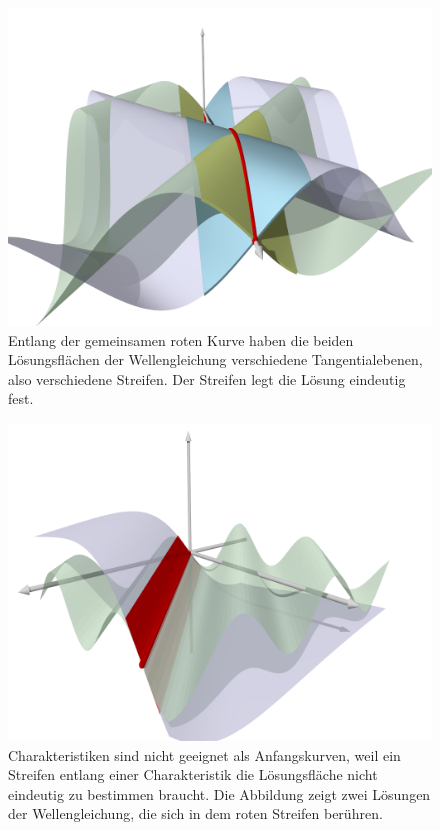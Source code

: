 \begin{figure}
\centering
\includegraphics[width=\hsize]{../common/3d/streifen2.png}
\caption{Entlang der gemeinsamen roten Kurve haben die beiden
Lösungsflächen der Wellengleichung verschiedene Tangentialebenen,
also verschiedene Streifen. 
Der Streifen legt die Lösung eindeutig fest.
\label{skript:streifen:eindeutig}}
\end{figure}

\begin{figure}
\centering
\includegraphics[width=\hsize]{../common/3d/streifen1.png}
\caption{Charakteristiken sind nicht geeignet als Anfangskurven,
weil ein Streifen entlang einer Charakteristik die Lösungsfläche
nicht eindeutig zu bestimmen braucht. Die Abbildung zeigt zwei Lösungen
der Wellengleichung, die sich in dem roten Streifen berühren.
\label{skript:streifen:zweideutig}}
\end{figure}

